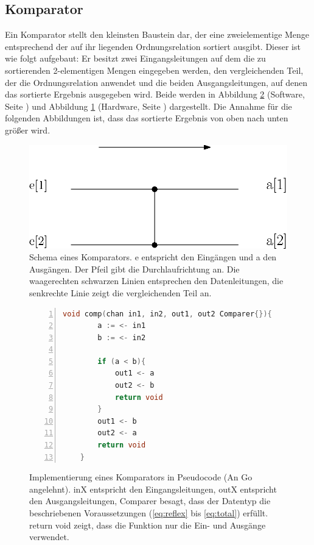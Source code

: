\documentclass[11pt,ngerman]{article}
\begin{document}
\subsection{Komparator}
Ein Komparator stellt den kleinsten Baustein dar, der eine zweielementige Menge entsprechend der auf ihr liegenden Ordnungsrelation sortiert ausgibt. Dieser ist wie folgt aufgebaut: Er besitzt zwei Eingangsleitungen auf dem die zu sortierenden 2-elementigen Mengen eingegeben werden, den vergleichenden Teil, der die Ordnungsrelation anwendet und die beiden Ausgangsleitungen, auf denen das sortierte Ergebnis ausgegeben wird. Beide werden in Abbildung \ref{fig:kompsoft} (Software, Seite \pageref{fig:kompsoft}) und Abbildung \ref{fig:komparator} (Hardware, Seite \pageref{fig:komparator}) dargestellt. Die Annahme für die folgenden Abbildungen ist, dass das sortierte Ergebnis von oben nach unten größer wird.
\begin{figure}
\begin{center}
\includegraphics[scale=0.8]{Komparator1.eps}
\end{center}
\caption{Schema eines Komparators. e entspricht den Eingängen und a den Ausgängen. Der Pfeil gibt die Durchlaufrichtung an. Die waagerechten schwarzen Linien entsprechen den Datenleitungen, die senkrechte Linie zeigt die vergleichenden Teil an.}
\label{fig:komparator}
\end{figure}
\begin{figure}
\begin{center}
\begin{lstlisting}[language=C,tabsize=4,numbers=left]
    void comp(chan in1, in2, out1, out2 Comparer{}){
        a := <- in1
        b := <- in2
        
        if (a < b){
            out1 <- a
            out2 <- b
            return void
        }
        out1 <- b
        out2 <- a
        return void
    }
\end{lstlisting}
\caption{Implementierung eines Komparators in Pseudocode (An Go angelehnt). inX entspricht den Eingangsleitungen, outX entspricht den Ausgangsleitungen, Comparer besagt, dass der Datentyp die beschriebenen Voraussetzungen (\eqref{eq:reflex} bis \eqref{eq:total}) erfüllt. \glqq return void\grqq{} zeigt, dass die Funktion nur die Ein- und Ausgänge verwendet.}
\label{fig:kompsoft}
\end{center}
\end{figure}
\end{document}
